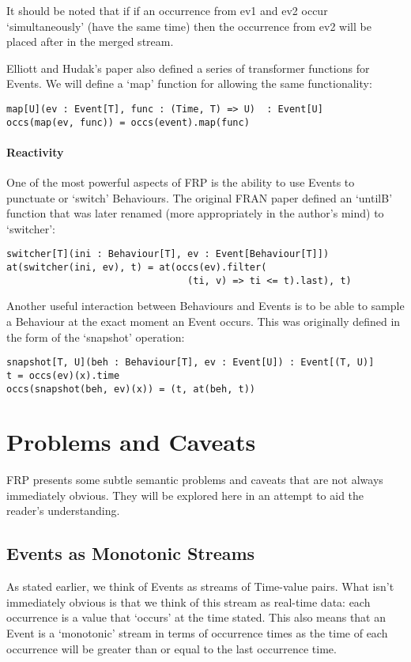 \documentclass[12pt]{article}
\begin{document}
        It should be noted that if if an occurrence from ev1 and ev2 occur `simultaneously' (have the same time) then
        the occurrence from ev2 will be placed after in the merged stream.
         
         Elliott and Hudak's paper also defined a series of transformer functions for Events. We will define a
         `map' function for allowing the same functionality:
 
\begin{verbatim}
map[U](ev : Event[T], func : (Time, T) => U)  : Event[U]
occs(map(ev, func)) = occs(event).map(func)
\end{verbatim}         
          
        \paragraph{Reactivity}
          One of the most powerful aspects of FRP is the ability to use Events to punctuate or `switch' Behaviours.
          The original FRAN paper defined an `untilB' function that was later renamed (more appropriately in the
          author's mind) to `switcher':

\begin{verbatim}
switcher[T](ini : Behaviour[T], ev : Event[Behaviour[T]])
at(switcher(ini, ev), t) = at(occs(ev).filter(
                                (ti, v) => ti <= t).last), t)
\end{verbatim}

          Another useful interaction between Behaviours and Events is to be able to sample
          a Behaviour at the exact moment an Event occurs. This was originally defined in the
          form of the `snapshot' operation:

\begin{verbatim}
snapshot[T, U](beh : Behaviour[T], ev : Event[U]) : Event[(T, U)]
t = occs(ev)(x).time
occs(snapshot(beh, ev)(x)) = (t, at(beh, t))
\end{verbatim}          
          
          
  \section{Problems and Caveats}
    FRP presents some subtle semantic problems and caveats that are not always immediately obvious.
    They will be explored here in an attempt to aid the reader's understanding.
     
    \subsection{Events as Monotonic Streams}
      As stated earlier, we think of Events as streams of Time-value pairs. What isn't immediately
      obvious is that we think of this stream as real-time data: each occurrence is a value that
      `occurs' at the time stated. This also means that an Event is a `monotonic' stream in terms of
      occurrence times as the time of each occurrence will be greater than or equal to the last occurrence
      time.
      
\end{document}
